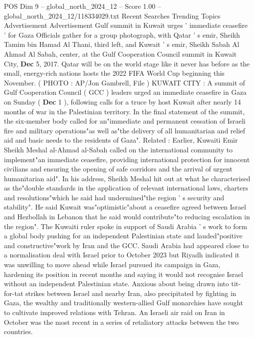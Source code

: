 \begin{textsample}{POS Dim 9 – global\_north\_2024\_12 – Score 1.00 – global\_north\_2024\_12/118334029.txt}  \label{ex:f9_pos_333}
Recent Searches Trending Topics Advertisement Advertisement Gulf summit in Kuwait urges ' immediate ceasefire ' for Gaza Officials gather for a group photograph, with Qatar ' s emir, Sheikh Tamim bin Hamad Al Thani, third left, and Kuwait ' s emir, Sheikh Sabah Al Ahmad Al Sabah, center, at the Gulf Cooperation Council summit in Kuwait City, \textbf{Dec} 5, 2017.
Qatar will be on the world stage like it never has before as the small, energy-rich nations hosts the 2022 FIFA World Cup beginning this November. ( PHOTO : AP/Jon Gambrell, File ) KUWAIT CITY : A summit of Gulf Cooperation Council ( GCC ) leaders urged an immediate ceasefire in Gaza on Sunday ( \textbf{Dec} 1 ), following calls for a truce by host Kuwait after nearly 14 months of war in the Palestinian territory.
In the final statement of the summit, the six-member body called for an"immediate and permanent cessation of Israeli fire and military operations"as well as"the delivery of all humanitarian and relief aid and basic needs to the residents of Gaza".
Related : Earlier, Kuwaiti Emir Sheikh Meshal al-Ahmad al-Sabah called on the international community to implement"an immediate ceasefire, providing international protection for innocent civilians and ensuring the opening of safe corridors and the arrival of urgent humanitarian aid".
In his address, Sheikh Meshal hit out at what he characterised as the"double standards in the application of relevant international laws, charters and resolutions"which he said had undermined"the region ' s security and stability".
He said Kuwait was"optimistic"about a ceasefire agreed between Israel and Hezbollah in Lebanon that he said would contribute"to reducing escalation in the region".
The Kuwaiti ruler spoke in support of Saudi Arabia ' s work to form a global body pushing for an independent Palestinian state and lauded"positive and constructive"work by Iran and the GCC.
Saudi Arabia had appeared close to a normalisation deal with Israel prior to October 2023 but Riyadh indicated it was unwilling to move ahead while Israel pursued its campaign in Gaza, hardening its position in recent months and saying it would not recognise Israel without an independent Palestinian state.
Anxious about being drawn into tit-for-tat strikes between Israel and nearby Iran, also precipitated by fighting in Gaza, the wealthy and traditionally western-allied Gulf monarchies have sought to cultivate improved relations with Tehran.
An Israeli air raid on Iran in October was the most recent in a series of retaliatory attacks between the two countries.

\end{textsample}
